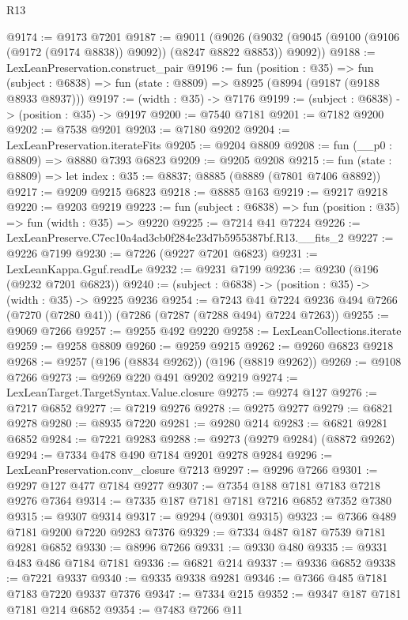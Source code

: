 \begin{lexlean}{R13}
\begin{coremodule}
@9174 := @9173 @7201
@9187 := @9011
    (@9026 (@9032 (@9045 (@9100 (@9106 (@9172 (@9174 @8838)) @9092)) (@8247 @8822 @8853)) @9092))
@9188 := LexLeanPreservation.construct_pair
@9196 := fun (position : @35) =>
  fun (subject : @6838) => fun (state : @8809) => @8925 (@8994 (@9187 (@9188 @8933 @8937)))
@9197 := (width : @35) -> @7176
@9199 := (subject : @6838) -> (position : @35) -> @9197
@9200 := @7540 @7181
@9201 := @7182 @9200
@9202 := @7538 @9201
@9203 := @7180 @9202
@9204 := LexLeanPreservation.iterateFits
@9205 := @9204 @8809
@9208 := fun (__p0 : @8809) => @8880 @7393 @6823
@9209 := @9205 @9208
@9215 := fun (state : @8809) => let index : @35 := @8837; @8885 (@8889 (@7801 @7406 @8892))
@9217 := @9209 @9215 @6823
@9218 := @8885 @163
@9219 := @9217 @9218
@9220 := @9203 @9219
@9223 := fun (subject : @6838) => fun (position : @35) => fun (width : @35) => @9220
@9225 := @7214 @41 @7224
@9226 := LexLeanPreserve.C7ec10a4ad3cb0f284e23d7b5955387bf.R13.__fits_2
@9227 := @9226 @7199
@9230 := @7226 (@9227 @7201 @6823)
@9231 := LexLeanKappa.Gguf.readLe
@9232 := @9231 @7199
@9236 := @9230 (@196 (@9232 @7201 @6823))
@9240 := (subject : @6838) -> (position : @35) -> (width : @35) -> @9225 @9236
@9254 := @7243
    @41
    @7224
    @9236
    @494
    @7266
    (@7270 (@7280 @41))
    (@7286 (@7287 (@7288 @494) @7224 @7263))
@9255 := @9069 @7266
@9257 := @9255 @492 @9220
@9258 := LexLeanCollections.iterate
@9259 := @9258 @8809
@9260 := @9259 @9215
@9262 := @9260 @6823 @9218
@9268 := @9257 (@196 (@8834 @9262)) (@196 (@8819 @9262))
@9269 := @9108 @7266
@9273 := @9269 @220 @491 @9202 @9219
@9274 := LexLeanTarget.TargetSyntax.Value.closure
@9275 := @9274 @127
@9276 := @7217 @6852
@9277 := @7219 @9276
@9278 := @9275 @9277
@9279 := @6821 @9278
@9280 := @8935 @7220
@9281 := @9280 @214
@9283 := @6821 @9281 @6852
@9284 := @7221 @9283
@9288 := @9273 (@9279 @9284) (@8872 @9262)
@9294 := @7334 @478 @490 @7184 @9201 @9278 @9284
@9296 := LexLeanPreservation.conv_closure @7213
@9297 := @9296 @7266
@9301 := @9297 @127 @477 @7184 @9277
@9307 := @7354 @188 @7181 @7183 @7218 @9276 @7364
@9314 := @7335 @187 @7181 @7181 @7216 @6852 @7352 @7380
@9315 := @9307 @9314
@9317 := @9294 (@9301 @9315)
@9323 := @7366 @489 @7181 @9200 @7220 @9283 @7376
@9329 := @7334 @487 @187 @7539 @7181 @9281 @6852
@9330 := @8996 @7266
@9331 := @9330 @480
@9335 := @9331 @483 @486 @7184 @7181
@9336 := @6821 @214
@9337 := @9336 @6852
@9338 := @7221 @9337
@9340 := @9335 @9338 @9281
@9346 := @7366 @485 @7181 @7183 @7220 @9337 @7376
@9347 := @7334 @215
@9352 := @9347 @187 @7181 @7181 @214 @6852
@9354 := @7483 @7266 @11

\end{coremodule}
\end{lexlean}
